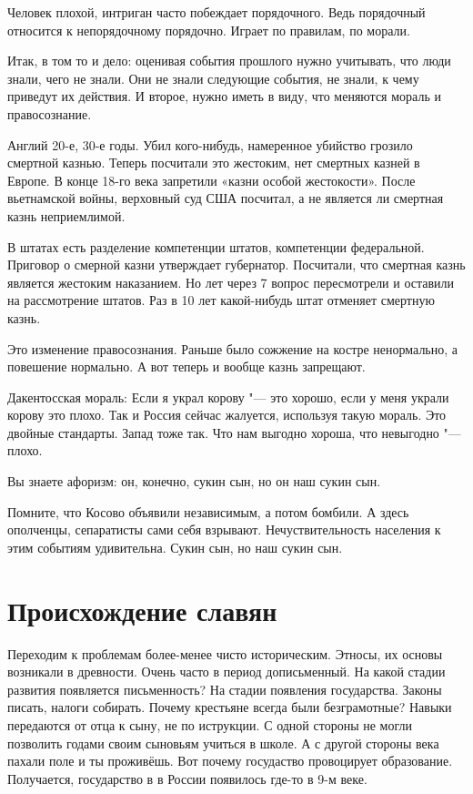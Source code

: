 \begin{enumerate}
Человек плохой, интриган часто побеждает порядочного. Ведь порядочный относится к непорядочному порядочно. Играет по правилам, по морали.

Итак, в том то и дело: оценивая события прошлого нужно учитывать, что люди знали, чего не знали. Они не знали следующие события, не знали, к чему приведут их действия. И второе, нужно иметь в виду, что меняются мораль и правосознание.

Англий 20-е, 30-е годы. Убил кого-нибудь, намеренное убийство грозило смертной казнью. Теперь посчитали это жестоким, нет смертных казней в Европе.
В конце 18-го века запретили «казни особой жестокости».
После вьетнамской войны, верховный суд США посчитал, а не является ли смертная казнь неприемлимой.

В штатах есть разделение компетенции штатов, компетенции федеральной. Приговор о смерной казни утверждает губернатор. Посчитали, что смертная казнь является жестоким наказанием. Но лет через 7 вопрос пересмотрели и оставили на рассмотрение штатов. Раз в 10 лет какой-нибудь штат отменяет смертную казнь.

Это изменение правосознания. Раньше было сожжение на костре ненормально, а повешение нормально. А вот теперь и вообще казнь запрещают.

Дакентосская мораль: Если я украл корову "--- это хорошо, если у меня украли корову это плохо. Так и Россия сейчас жалуется, используя такую мораль. Это двойные стандарты. Запад тоже так. Что нам выгодно хороша, что невыгодно "--- плохо.

Вы знаете афоризм: он, конечно, сукин сын, но он наш сукин сын.

Помните, что Косово объявили независимым, а потом бомбили. А здесь ополченцы, сепаратисты сами себя взрывают. Нечуствительность населения к этим событиям удивительна. Сукин сын, но наш сукин сын.
\end{enumerate}

\section{Происхождение славян}
Переходим к проблемам более-менее чисто историческим. Этносы, их основы возникали в древности. Очень часто в период дописьменный. На какой стадии развития появляется письменность? На стадии появления государства. Законы писать, налоги собирать. Почему крестьяне всегда были безграмотные? Навыки передаются от отца к сыну, не по иструкции.
С одной стороны не могли позволить годами своим сыновьям учиться в школе. А с другой стороны века пахали поле и ты проживёшь.
Вот почему госудаство провоцирует образование. Получается, государство в в России появилось где-то в 9-м веке.

